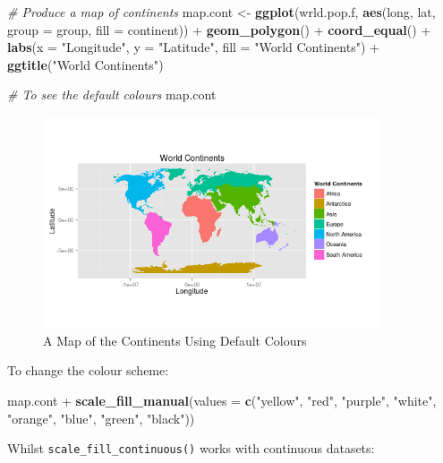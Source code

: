 \documentclass[]{article}
\newenvironment{Shaded}{}{}
\newcommand{\KeywordTok}[1]{\textcolor[rgb]{0.00,0.44,0.13}{\textbf{{#1}}}}
\newcommand{\DataTypeTok}[1]{\textcolor[rgb]{0.56,0.13,0.00}{{#1}}}
\newcommand{\StringTok}[1]{\textcolor[rgb]{0.25,0.44,0.63}{{#1}}}
\newcommand{\CommentTok}[1]{\textcolor[rgb]{0.38,0.63,0.69}{\textit{{#1}}}}
\newcommand{\NormalTok}[1]{{#1}}
\let\Oldincludegraphics\includegraphics
\renewcommand{\includegraphics}[1]{\Oldincludegraphics[width=10cm]{#1}}
\begin{document}
\begin{Shaded}
\begin{Highlighting}[]
\CommentTok{# Produce a map of continents}
\NormalTok{map.cont <- }\KeywordTok{ggplot}\NormalTok{(wrld.pop.f, }\KeywordTok{aes}\NormalTok{(long, lat, }\DataTypeTok{group =} \NormalTok{group, }\DataTypeTok{fill =} \NormalTok{continent)) + }
    \KeywordTok{geom_polygon}\NormalTok{() + }\KeywordTok{coord_equal}\NormalTok{() + }\KeywordTok{labs}\NormalTok{(}\DataTypeTok{x =} \StringTok{"Longitude"}\NormalTok{, }\DataTypeTok{y =} \StringTok{"Latitude"}\NormalTok{, }\DataTypeTok{fill =} \StringTok{"World Continents"}\NormalTok{) + }
    \KeywordTok{ggtitle}\NormalTok{(}\StringTok{"World Continents"}\NormalTok{)}

\CommentTok{# To see the default colours}
\NormalTok{map.cont}
\end{Highlighting}
\end{Shaded}
\begin{figure}[htbp]
\centering
\includegraphics{figure/A_Map_of_the_Continents_Using_Default_Colours.png}
\caption{A Map of the Continents Using Default Colours}
\end{figure}

To change the colour scheme:

\begin{Shaded}
\begin{Highlighting}[]
\NormalTok{map.cont + }\KeywordTok{scale_fill_manual}\NormalTok{(}\DataTypeTok{values =} \KeywordTok{c}\NormalTok{(}\StringTok{"yellow"}\NormalTok{, }\StringTok{"red"}\NormalTok{, }\StringTok{"purple"}\NormalTok{, }\StringTok{"white"}\NormalTok{, }
    \StringTok{"orange"}\NormalTok{, }\StringTok{"blue"}\NormalTok{, }\StringTok{"green"}\NormalTok{, }\StringTok{"black"}\NormalTok{))}
\end{Highlighting}
\end{Shaded}
Whilst \texttt{scale\_fill\_continuous()} works with continuous
datasets:
\end{document}

